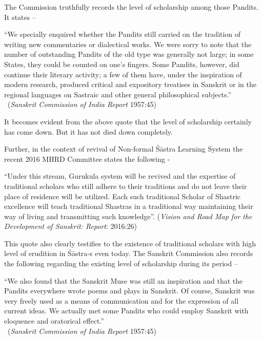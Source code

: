 The Commission truthfully records the level of scholarship among those Pandits. It states –
\begin{myquote}
\eleven
“We specially enquired whether the Pandits still carried on the tradition of writing new commentaries or dialectical works. We were sorry to note that the number of outstanding Pandits of the old type was generally not large; in some States, they could be counted on one's fingers. Some Pandits, however, did continue their literary activity; a few of them have, under the inspiration of modern research, produced critical and expository treatises in Sanskrit or in the regional languages on Sastraic and other general philosophical subjects.”\\[-15pt] 

~\hfill({\sl Sanskrit Commission of India Report} 1957:45)
\end{myquote}

It becomes evident from the above quote that the level of scholarship certainly has come down. But it has not died down completely. 

Further, in the context of revival of Non-formal Śāstra Learning System the recent 2016 MHRD Committee states the following - 
\begin{myquote}
\eleven
“Under this stream, Gurukula system will be revived and the expertise of traditional scholars who still adhere to their traditions and do not leave their place of residence will be utilized. Each such traditional Scholar of Shastric excellence will teach traditional Shastras in a traditional way maintaining their way of living and transmitting such knowledge”. \hfill({\sl Vision and Road Map for the Development of Sanskrit: Report}: 2016:26) 
\end{myquote}
	
This quote also clearly testifies to the existence of traditional scholars with high level of erudition in Śāstra-s even today. The Sanskrit Commission also records the following regarding the existing level of scholarship during its period – 
\begin{myquote}
\eleven
“We also found that the Sanskrit Muse was still an inspiration and that the Pandits everywhere wrote poems and plays in Sanskrit. Of course, Sanskrit was very freely used as a means of communication and for the expression of all current ideas. We actually met some Pandits who could employ Sanskrit with eloquence and oratorical effect.”\\[-15pt]

~\hfill({\sl Sanskrit Commission of India Report} 1957:45)
\end{myquote}
\newpage

